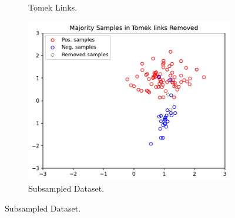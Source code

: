 \documentclass[a4paper]{article}
\begin{document}
{\begin{enumerate}
\begin{figure}[h]
\begin{subfigure}{0.32\textwidth}
        \caption{Tomek Links.}
    \end{subfigure}
    \hfill
    \begin{subfigure}{0.32\textwidth}
        \centering
        \includegraphics[width=\textwidth]{figures/removed_dataset}
        \caption{Subsampled Dataset.}
    \end{subfigure}
\end{figure}

\end{enumerate}


}
\end{document}
